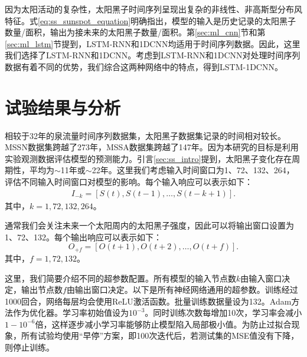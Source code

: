 因为太阳活动的复杂性，太阳黑子时间序列呈现出复杂的非线性、非高斯型分布风特征。式\ref{eq:ss_sunspot_equation}明确指出，模型的输入是历史记录的太阳黑子数量/面积，输出为接未来的太阳黑子数量/面积。第\ref{sec:ml_cnn}节和第\ref{sec:ml_lstm}节提到，LSTM-RNN和1DCNN均适用于时间序列数据。因此，这里我们选择了LSTM-RNN和1DCNN。考虑到LSTM-RNN和1DCNN对处理时间序列数据有着不同的优势，我们综合这两种网络中的特点，得到LSTM-1DCNN。

\section{试验结果与分析}\label{sec:ss_result}

相较于32年的泉流量时间序列数据集，太阳黑子数据集记录的时间相对较长。MSSN数据集跨越了273年，MSSA数据集跨越了147年。因为本研究的目标是利用实验观测数据评估模型的预测能力。引言\ref{sec:ss_intro}提到，太阳黑子变化存在周期性，平均为$\sim$11年或$\sim$22年。这里我们考虑输入时间窗口为1、72、132、264，评估不同输入时间窗口对模型的影响。每个输入响应可以表示如下：
\begin{equation}
  \label{eq:ss_input}
  \begin{split}
    I_{-k}=[S(t),S(t-1),\ldots,S(t-k+1)].
  \end{split}
\end{equation}
其中，$k=1,72,132,264$。

通常我们会关注未来一个太阳周内的太阳黑子强度，因此可以将输出窗口设置为1、72、132。每个输出响应可以表示如下：
\begin{equation}
  \label{eq:ss_output}
  O_{+f}=[O(t+1),O(t+2),\ldots,O(t+f)].
\end{equation}
其中，$f=1,72,132$。

这里，我们简要介绍不同的超参数配置。所有模型的输入节点数$k$由输入窗口决定，输出节点数$f$由输出窗口决定。以下是所有神经网络通用的超参数。训练经过1000回合，网络每层均会使用ReLU激活函数。批量训练数据量设为132。Adam方法作为优化器。学习率初始值设为$10^{-3}$。同时训练次数每增加10次，学习率会减小$1-10^{-6}$倍，这样逐步减小学习率能够防止模型陷入局部极小值。为防止过拟合现象，所有试验均使用“早停”方案，即100次迭代后，若测试集的MSE值没有下降，则停止训练。


